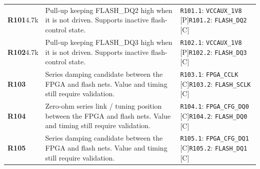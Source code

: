 \documentclass[11pt,a4paper]{article}
\begin{document}
\begin{longtable}{@{}P{27mm}P{83mm}P{58mm}@{}}
\textbf{R101}\newline 4.7k & Pull-up keeping FLASH\_DQ2 high when it is not driven. Supports inactive flash-control state. & \nolinkurl{R101.1}: \nolinkurl{VCCAUX_1V8} [P]\newline \nolinkurl{R101.2}: \nolinkurl{FLASH_DQ2} [C] \\
\textbf{R102}\newline 4.7k & Pull-up keeping FLASH\_DQ3 high when it is not driven. Supports inactive flash-control state. & \nolinkurl{R102.1}: \nolinkurl{VCCAUX_1V8} [P]\newline \nolinkurl{R102.2}: \nolinkurl{FLASH_DQ3} [C] \\
\textbf{R103} & Series damping candidate between the FPGA and flash nets. Value and timing still require validation. & \nolinkurl{R103.1}: \nolinkurl{FPGA_CCLK} [C]\newline \nolinkurl{R103.2}: \nolinkurl{FLASH_SCLK} [C] \\
\textbf{R104} & Zero-ohm series link / tuning position between the FPGA and flash nets. Value and timing still require validation. & \nolinkurl{R104.1}: \nolinkurl{FPGA_CFG_DQ0} [C]\newline \nolinkurl{R104.2}: \nolinkurl{FLASH_DQ0} [C] \\
\textbf{R105} & Series damping candidate between the FPGA and flash nets. Value and timing still require validation. & \nolinkurl{R105.1}: \nolinkurl{FPGA_CFG_DQ1} [C]\newline \nolinkurl{R105.2}: \nolinkurl{FLASH_DQ1} [C] \\

\end{longtable}
\end{document}
